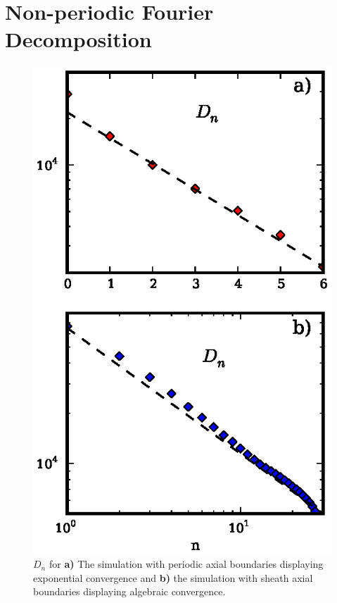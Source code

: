 \documentclass[showpacs,preprintnumbers,amsmath,amssymb,superscriptaddress,aip]{revtex4-1}
\begin{document}
\appendix


\section{Non-periodic Fourier Decomposition}

\begin{figure}[!htbp]
\includegraphics[]{fourier_convergence}
\hfil
\caption{$D_n$ for \textbf{a)} The simulation with periodic axial
boundaries displaying exponential convergence and \textbf{b)} the simulation with sheath axial boundaries displaying algebraic convergence.}
\label{fourier_convergence}
\end{figure}
\end{document}
